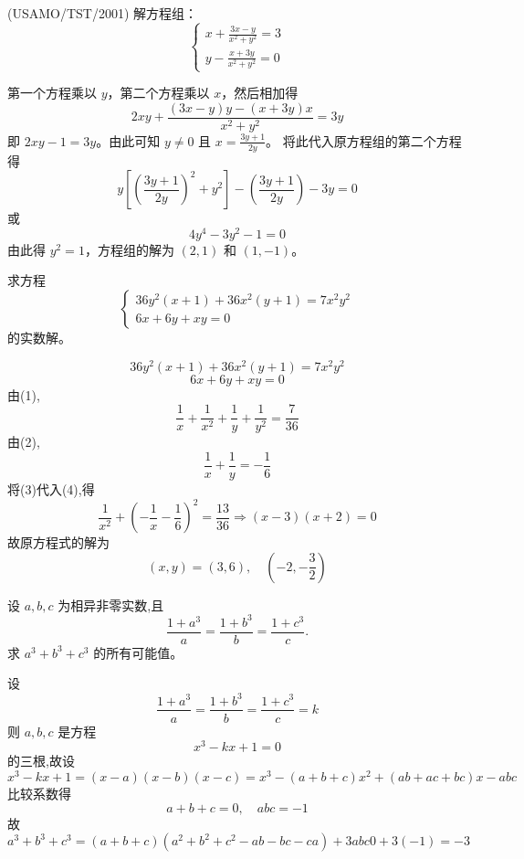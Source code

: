 \begin{questions}
    \question (USAMO/TST/2001) 解方程组：
\[
\begin{cases}
x + \frac{3x - y}{x^2 + y^2} = 3 \\
y - \frac{x + 3y}{x^2 + y^2} = 0
\end{cases}
\]

\begin{solution}
第一个方程乘以 $y$，第二个方程乘以 $x$，然后相加得
\[
2xy + \frac{(3x - y)y - (x + 3y)x}{x^2 + y^2} = 3y
\]
即 $2xy - 1 = 3y$。由此可知 $y \neq 0$ 且 $x = \frac{3y + 1}{2y}$。
将此代入原方程组的第二个方程得
\[
y\left[ \left( \frac{3y + 1}{2y} \right)^2 + y^2 \right] - \left( \frac{3y + 1}{2y} \right) - 3y = 0
\]
或
\[
4y^4 - 3y^2 - 1 = 0
\]
由此得 $y^2 = 1$，方程组的解为 $(2, 1)$ 和 $(1, -1)$。
\end{solution}

    \question 求方程
    \[
    \begin{cases}
    36y^{2}(x+1)+36x^{2}(y+1)=7x^{2}y^{2} \\
    6x+6y+xy=0
    \end{cases}
    \]
    的实数解。
    \begin{solution}
        \[
        36y^{2}(x+1)+36x^{2}(y+1)=7x^{2}y^{2} \tag{1}
        \]
        \[
        6x+6y+xy=0
        \]
        由(1),
        \[
        \frac{1}{x} + \frac{1}{x^2} + \frac{1}{y} + \frac{1}{y^2} = \frac{7}{36} \tag{3}
        \]
        由(2),
        \[
        \frac{1}{x} + \frac{1}{y} = -\frac{1}{6} \tag{4}
        \]
        将(3)代入(4),得
        \[
        \frac{1}{x^2} + \left(-\frac{1}{x}-\frac{1}{6}\right)^2 = \frac{13}{36} \Rightarrow (x-3)(x+2)=0
        \]
        故原方程式的解为
        \[
        (x,y) = (3,6),\quad \left(-2,-\frac{3}{2}\right)
        \]
    \end{solution}

    \question 设 $a,b,c$ 为相异非零实数,且
    \[
    \frac{1+a^3}{a}=\frac{1+b^3}{b}=\frac{1+c^3}{c}.
    \]
    求 $a^3+b^3+c^3$ 的所有可能值。
    \begin{solution}
        设
        \[
        \frac{1+a^3}{a}=\frac{1+b^3}{b}=\frac{1+c^3}{c}=k
        \]
        则 $a,b,c$ 是方程
        \[
        x^3-kx+1=0
        \]
        的三根,故设
        \[
        x^3-kx+1=(x-a)(x-b)(x-c)=x^3-(a+b+c)x^2+(ab+ac+bc)x-abc
        \]
        比较系数得
        \[
        a+b+c=0,\quad abc=-1
        \]
        故
        \[
        a^3+b^3+c^3=(a+b+c)(a^2+b^2+c^2-ab-bc-ca)+3abc0+3(-1)=-3
        \]
    \end{solution}


\end{questions}
